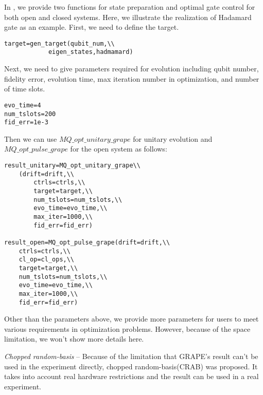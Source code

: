 In \MindQuantum, we provide two functions for state preparation and optimal gate control for both open and closed systems. Here, we illustrate the realization of Hadamard gate as an example. First, we need to define the target.
\begin{lstlisting}
target=gen_target(qubit_num,\\
            eigen_states,hadmamard)
\end{lstlisting}
Next, we need to give parameters required for evolution including qubit number, fidelity error, evolution time, max iteration number in optimization, and number of time slots.
\begin{lstlisting}
evo_time=4
num_tslots=200
fid_err=1e-3
\end{lstlisting}
Then we can use $MQ\_opt\_unitary\_grape$ for unitary evolution and $MQ\_opt\_pulse\_grape$ for the open system as follows:
\begin{lstlisting}
result_unitary=MQ_opt_unitary_grape\\
    (drift=drift,\\
        ctrls=ctrls,\\
        target=target,\\
        num_tslots=num_tslots,\\
        evo_time=evo_time,\\
        max_iter=1000,\\
        fid_err=fid_err)

result_open=MQ_opt_pulse_grape(drift=drift,\\
    ctrls=ctrls,\\
    cl_op=cl_ops,\\
    target=target,\\
    num_tslots=num_tslots,\\
    evo_time=evo_time,\\
    max_iter=1000,\\
    fid_err=fid_err)
\end{lstlisting}
Other than the parameters above, we provide more parameters for users to meet various requirements in optimization problems. However, because of the space limitation, we won't show more details here.

\textit{Chopped random-basis} -- Because of the limitation that GRAPE's result can't be used in the experiment directly, chopped random-basis(CRAB) was proposed. It takes into account real hardware restrictions and the result can be used in a real experiment.

